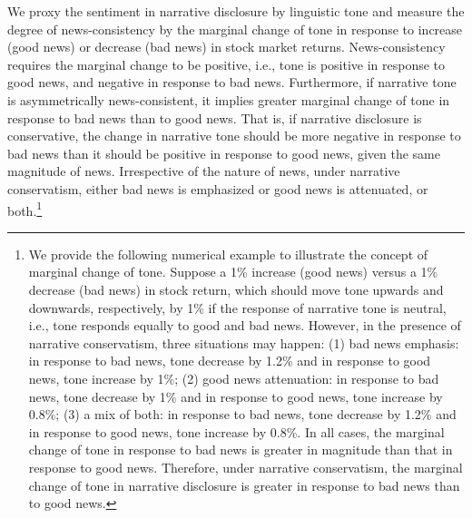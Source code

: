 \documentclass[letterpaper,12pt]{article}
\begin{document}
\begin{spacing}{1.5}
We proxy the sentiment in narrative disclosure by linguistic tone and measure the degree of news-consistency by the marginal change of tone in response to increase (good news) or decrease (bad news) in stock market returns. News-consistency requires the marginal change to be positive, i.e., tone is positive in response to good news, and negative in response to bad news. Furthermore, if narrative tone is asymmetrically news-consistent, it implies greater marginal change of tone in response to bad news than to good news. That is, if narrative disclosure is conservative, the change in narrative tone should be more negative in response to bad news than it should be positive in response to good news, given the same magnitude of news. Irrespective of the nature of news, under narrative conservatism, either bad news is emphasized or good news is attenuated, or both.\footnote{We provide the following numerical example to illustrate the concept of marginal change of tone. Suppose a 1\% increase (good news) versus a 1\% decrease (bad news) in stock return, which should move tone upwards and downwards, respectively, by 1\% if the response of narrative tone is neutral, i.e., tone responds equally  to good and bad news. However, in the presence of narrative conservatism, three situations may happen: (1) bad news emphasis: in response to bad news, tone decrease by 1.2\% and in response to good news, tone increase by 1\%; (2) good news attenuation: in response to bad news, tone decrease by 1\% and in response to good news, tone increase by 0.8\%; (3) a mix of both: in response to bad news, tone decrease by 1.2\% and in response to good news, tone increase by 0.8\%. In all cases, the marginal change of tone in response to bad news is greater in magnitude than that in response to good news. Therefore, under narrative conservatism, the marginal change of tone in narrative disclosure is greater in response to bad news than to good news.} 


\end{spacing}
\end{document}
